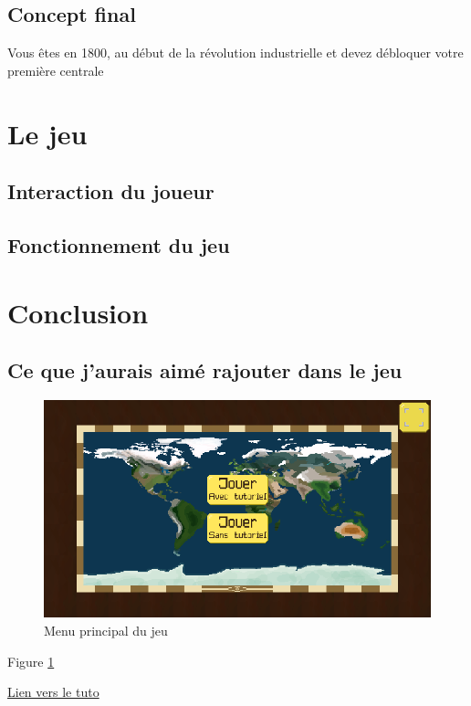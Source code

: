 \documentclass{article}
\begin{document}
        \subsection{Concept final}
        Vous êtes en 1800, au début de la révolution industrielle et devez débloquer votre première centrale 

        \section{Le jeu}
        \subsection{Interaction du joueur}
        
        

        \subsection{Fonctionnement du jeu}
        
        \section{Conclusion}
        \subsection{Ce que j'aurais aimé rajouter dans le jeu}

        \begin{figure}[h]
                \includegraphics[width=\linewidth]{../images/mainMenu}
                \caption{Menu principal du jeu}
                \label{fig:mainMenu}
        \end{figure}

        Figure \ref{fig:mainMenu}

        \href{https://www.latex-tutorial.com/tutorials/pgfplots/}{Lien vers le tuto}
\end{document}
